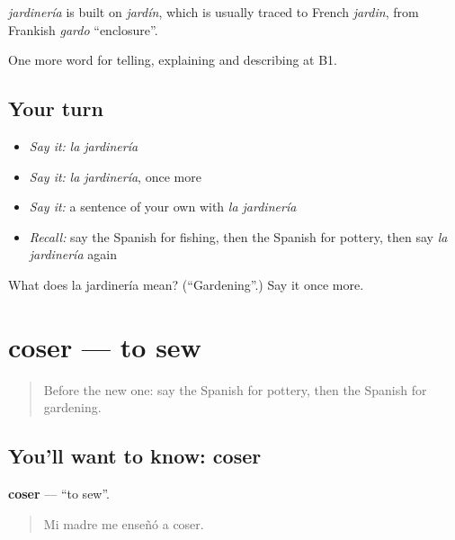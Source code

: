 \begin{cousinweb}
\emph{jardinería} is built on \emph{jardín}, which is usually traced to French \emph{jardin}, from Frankish \emph{gardo} \textquotedblleft{}enclosure\textquotedblright{}.
\end{cousinweb}

\begin{grammarlens}[title={What you've built}]
One more word for telling, explaining and describing at B1.
\end{grammarlens}

\subsection*{Your turn}
\begin{itemize}
\raggedright
  \item \emph{Say it:} \emph{la jardinería}
  \item \emph{Say it:} \emph{la jardinería}, once more
  \item \emph{Say it:} a sentence of your own with \emph{la jardinería}
  \item \emph{Recall:} say the Spanish for fishing, then the Spanish for pottery, then say \emph{la jardinería} again
\end{itemize}

\begin{tcolorbox}[breakable,colback=teal!4,colframe=teal!35!black,title={Before you move on}]
What does la jardinería mean? (\textquotedblleft{}Gardening\textquotedblright{}.) Say it once more.
\end{tcolorbox}
\section[coser]{coser — to sew}

\label{lesson:ES-C754-coser}



\begin{quote}
Before the new one: say the Spanish for pottery, then the Spanish for gardening.
\end{quote}

\subsection*{You'll want to know: coser}
\textbf{coser} — \textquotedblleft{}to sew\textquotedblright{}.

\begin{quote}
Mi madre me enseñó a coser.
\end{quote}

